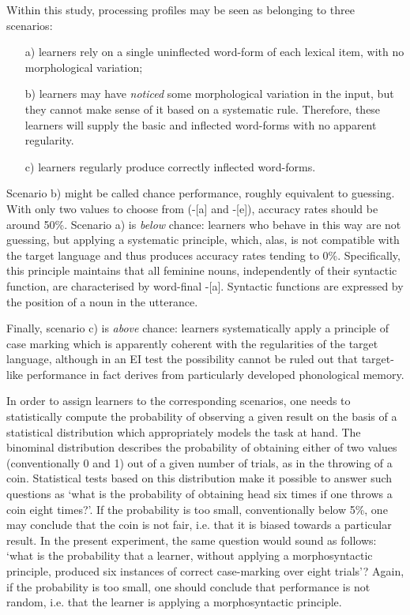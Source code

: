 Within this study, processing profiles may be seen as belonging to three scenarios: 

\begin{itemize}
    \item[a)] learners rely on a single uninflected word-form of each lexical item, with no morphological variation;
    \item[b)] learners may have \textit{noticed} some morphological variation in the input, but they cannot make sense of it based on a systematic rule. Therefore, these learners will supply the basic and inflected word-forms with no apparent regularity.
    \item[c)] learners regularly produce correctly inflected word-forms.
\end{itemize}

Scenario b) might be called chance performance, roughly equivalent to guessing. With only two values to choose from (-[a] and -[e]), accuracy rates should be around 50\%. Scenario a) is \textit{below} chance: learners who behave in this way are not guessing, but applying a systematic principle, which, alas, is not compatible with the target language and thus produces accuracy rates tending to 0\%. Specifically, this principle maintains that all feminine nouns, independently of their syntactic function, are characterised by word-final -[a]. Syntactic functions are expressed by the position of a noun in the utterance.

Finally, scenario c) is \textit{above} chance: learners systematically apply a principle of case marking which is apparently coherent with the regularities of the target language, although in an EI test the possibility cannot be ruled out that target-like performance in fact derives from particularly developed phonological memory.

In order to assign learners to the corresponding scenarios, one needs to statistically compute the probability of observing a given result on the basis of a statistical distribution which appropriately models the task at hand. The binominal distribution describes the probability of obtaining either of two values (conventionally 0 and 1) out of a given number of trials, as in the throwing of a coin. Statistical tests based on this distribution make it possible to answer such questions as ‘what is the probability of obtaining head six times if one throws a coin eight times?’. If the probability is too small, conventionally below 5\%, one may conclude that the coin is not fair, i.e. that it is biased towards a particular result. In the present experiment, the same question would sound as follows: ‘what is the probability that a learner, without applying a morphosyntactic principle, produced six instances of correct case-marking over eight trials’? Again, if the probability is too small, one should conclude that performance is not random, i.e. that the learner is applying a morphosyntactic principle. 

